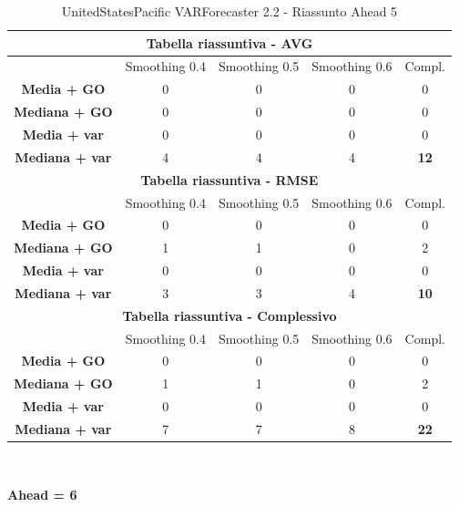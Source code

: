\documentclass[12pt,a4paper,oneside,openright]{book}
\begin{document}
\begin{table}[H]
\centering
\begin{tabular}{|c|c|c|c|c|}
\hline
\multicolumn{5}{|c|}{\textbf{Tabella riassuntiva - AVG}} \\
\hline
& Smoothing 0.4 & Smoothing 0.5 & Smoothing 0.6 & Compl.\\
\hline
\textbf{Media + GO} & 0 & 0 & 0 & 0\\
\hline
\textbf{Mediana + GO} & 0 & 0 & 0 & 0\\ 
\hline
\textbf{Media + var} & 0 & 0 & 0 & 0\\ 
\hline
\textbf{Mediana + var} & 4 & 4 & 4 & \textbf{12}\\ 
\hline
\multicolumn{5}{|c|}{\textbf{Tabella riassuntiva - RMSE}} \\
\hline
& Smoothing 0.4 & Smoothing 0.5 & Smoothing 0.6 & Compl.\\
\hline
\textbf{Media + GO} & 0 & 0 & 0 & 0\\
\hline
\textbf{Mediana + GO} & 1 & 1 & 0 & 2\\ 
\hline
\textbf{Media + var} & 0 & 0 & 0 & 0\\ 
\hline
\textbf{Mediana + var} & 3 & 3 & 4 & \textbf{10}\\ 
\hline
\multicolumn{5}{|c|}{\textbf{Tabella riassuntiva - Complessivo}} \\
\hline
& Smoothing 0.4 & Smoothing 0.5 & Smoothing 0.6 & Compl.\\
\hline
\textbf{Media + GO} & 0 & 0 & 0 & 0\\
\hline
\textbf{Mediana + GO} & 1 & 1 & 0 & 2\\ 
\hline
\textbf{Media + var} & 0 & 0 & 0 & 0\\ 
\hline
\textbf{Mediana + var} & 7 & 7 & 8 & \textbf{22}\\ 
\hline
\end{tabular} \\ 
\caption{UnitedStatesPacific VARForecaster 2.2 - Riassunto Ahead 5}
\end{table} 

\newpage

\textbf{Ahead = 6}
\end{document}
